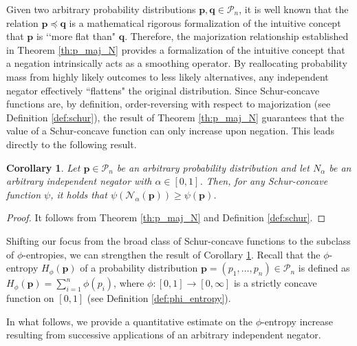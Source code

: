 \documentclass[pdflatex,sn-basic,iicol]{sn-jnl}%
\theoremstyle{thmstyleone}%
\newtheorem{corollary}{Corollary}[theorem]
\theoremstyle{thmstyletwo}%
\theoremstyle{thmstylethree}%
\newcommand{\N}{\mathcal{N}}
\newcommand{\cP}{\mathcal{P}}
\newcommand{\bp}{\mathbf{p}}
\newcommand{\bq}{\mathbf{q}}
\begin{document}
Given two arbitrary probability distributions $\bp,\bq\in\cP_n$, it is well known  \citep{marshall1979inequalities} that the 
relation $\bp\preceq\bq$ is a mathematical rigorous formalization of the 
intuitive concept that $\bp$ is \lq\lq more flat than" $\bq$.
Therefore, the majorization relationship established in Theorem \ref{th:p_maj_N} provides a formalization of the intuitive concept that a negation intrinsically acts as a smoothing operator. By reallocating probability mass from highly likely outcomes to less likely alternatives, any independent negator effectively ``flattens" the original distribution. Since Schur-concave functions are, by definition, order-reversing with respect to majorization (see Definition \ref{def:schur}), the result of Theorem \ref{th:p_maj_N} guarantees that the value of a Schur-concave function can only increase upon negation. This leads directly to the following result.

\begin{corollary}\label{cor:schur_concave_increase}
    Let $\bp\in \cP_n$ be an arbitrary probability distribution and let $N_{\alpha}$ be an arbitrary independent negator with $\alpha\in[0,1]$. Then, for any Schur-concave function $\psi$, it holds that $\psi(\N_\alpha(\bp))\geq \psi(\bp)$.
\end{corollary}
\begin{proof}
    It follows from Theorem \ref{th:p_maj_N} and Definition \ref{def:schur}.
\end{proof}


Shifting our focus from the broad class of Schur-concave functions to the subclass of $\phi$-entropies, we can strengthen the result of Corollary \ref{cor:schur_concave_increase}. Recall that the $\phi$-entropy $H_\phi(\bp)$ of a probability distribution $\bp=(p_1,\dots,p_n)\in\cP_n$ is defined as $H_\phi(\bp)=\sum_{i=1}^n\phi(p_i)$, where
$\phi:[0,1]\to [0, \infty]$ is a strictly concave function on $[0, 1]$ (see Definition \ref{def:phi_entropy}).

In what follows, we provide a quantitative estimate on the $\phi$-entropy increase resulting from successive applications of an
arbitrary independent negator.
\end{document}
